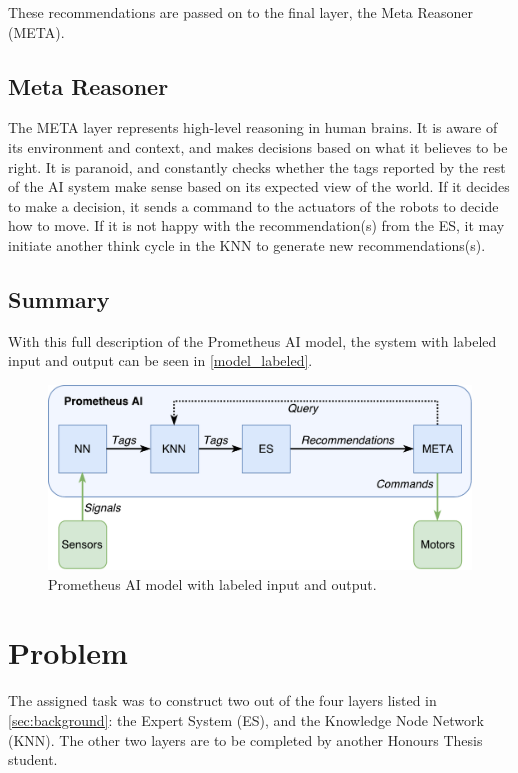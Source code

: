 \documentclass[titlepage,11pt]{article}
\begin{document}
These recommendations are passed on to the final layer, the Meta Reasoner (META).

\subsection{Meta Reasoner}

The META layer represents high-level reasoning in human brains. It is aware of its environment and context, and makes decisions based on what it believes to be right. It is paranoid, and constantly checks whether the tags reported by the rest of the AI system make sense based on its expected view of the world. If it decides to make a decision, it sends a command to the actuators of the robots to decide how to move. If it is not happy with the recommendation(s) from the ES, it may initiate another think cycle in the KNN to generate new recommendations(s).

\subsection{Summary}

With this full description of the Prometheus AI model, the system with labeled input and output can be seen in \autoref{model_labeled}.

\begin{figure}[!htb]
	\includegraphics[width=\textwidth]{figures/ai_model_labeled.pdf}
	\caption{Prometheus AI model with labeled input and output.}
	\label{model_labeled}
\end{figure}

\section{Problem}

The assigned task was to construct two out of the four layers listed in \autoref{sec:background}: the Expert System (ES), and the Knowledge Node Network (KNN). The other two layers are to be completed by another Honours Thesis student.
\end{document}
